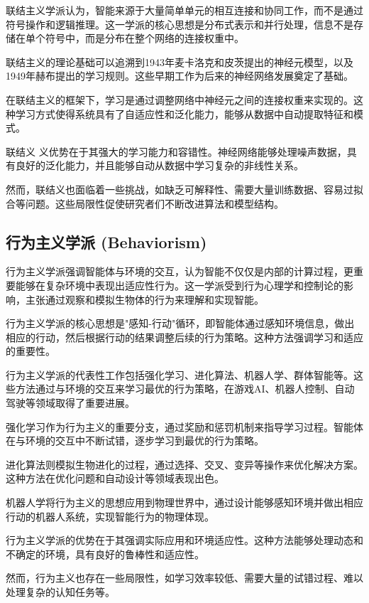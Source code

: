 联结主义学派认为，智能来源于大量简单单元的相互连接和协同工作，而不是通过符号操作和逻辑推理。这一学派的核心思想是分布式表示和并行处理，信息不是存储在单个符号中，而是分布在整个网络的连接权重中。

联结主义的理论基础可以追溯到1943年麦卡洛克和皮茨提出的神经元模型，以及1949年赫布提出的学习规则。这些早期工作为后来的神经网络发展奠定了基础。

在联结主义的框架下，学习是通过调整网络中神经元之间的连接权重来实现的。这种学习方式使得系统具有了自适应性和泛化能力，能够从数据中自动提取特征和模式。

联结义
义优势在于其强大的学习能力和容错性。神经网络能够处理噪声数据，具有良好的泛化能力，并且能够自动从数据中学习复杂的非线性关系。

然而，联结义也面临着一些挑战，如缺乏可解释性、需要大量训练数据、容易过拟合等问题。这些局限性促使研究者们不断改进算法和模型结构。

\subsection{行为主义学派 (Behaviorism)}

行为主义学派强调智能体与环境的交互，认为智能不仅仅是内部的计算过程，更重要能够在复杂环境中表现出适应性行为。这一学派受到行为心理学和控制论的影响，主张通过观察和模拟生物体的行为来理解和实现智能。

行为主义学派的核心思想是"感知-行动"循环，即智能体通过感知环境信息，做出相应的行动，然后根据行动的结果调整后续的行为策略。这种方法强调学习和适应的重要性。

行为主义学派的代表性工作包括强化学习、进化算法、机器人学、群体智能等。这些方法通过与环境的交互来学习最优的行为策略，在游戏AI、机器人控制、自动驾驶等领域取得了重要进展。

强化学习作为行为主义的重要分支，通过奖励和惩罚机制来指导学习过程。智能体在与环境的交互中不断试错，逐步学习到最优的行为策略。

进化算法则模拟生物进化的过程，通过选择、交叉、变异等操作来优化解决方案。这种方法在优化问题和自动设计等领域表现出色。

机器人学将行为主义的思想应用到物理世界中，通过设计能够感知环境并做出相应行动的机器人系统，实现智能行为的物理体现。

行为主义学派的优势在于其强调实际应用和环境适应性。这种方法能够处理动态和不确定的环境，具有良好的鲁棒性和适应性。

然而，行为主义也存在一些局限性，如学习效率较低、需要大量的试错过程、难以处理复杂的认知任务等。

